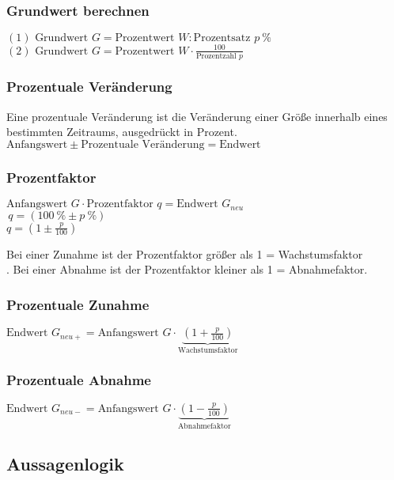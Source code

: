 \begin{multicols}{2}
    \subsubsection{Grundwert berechnen }
    \vspace{-4mm}
    $(1) \text{ Grundwert } G = \text{Prozentwert } W:\text{Prozentsatz } p\ \%$\\
    $(2) \text{ Grundwert } G = \text{Prozentwert } W \cdot \frac{100}{\text{Prozentzahl } p}$
    \subsubsection{Prozentuale Veränderung}
    \vspace{-4mm}
    Eine prozentuale Veränderung ist die Veränderung einer Größe innerhalb eines bestimmten Zeitraums, ausgedrückt in Prozent.\\
    $\text{Anfangswert} \pm \text{Prozentuale Veränderung} = \text{Endwert}$
    \subsubsection{Prozentfaktor}
    \vspace{-4mm}
    $\text{Anfangswert } G \cdot \text{Prozentfaktor } q = \text{Endwert } G_{neu}$\\
    $\,q = \left(100\ \% \pm p\ \%\right)$\\
    $q = \left(1 \pm \frac{p}{100}\right)$

    Bei einer Zunahme ist der Prozentfaktor größer als 1 = Wachstumsfaktor\\.
    Bei einer Abnahme ist der Prozentfaktor kleiner als 1 = Abnahmefaktor.
    \subsubsection{Prozentuale Zunahme}
    \vspace{-4mm}
    $\text{Endwert } G_{neu+} = \text{Anfangswert } G \cdot \underbrace{\left(1 + \frac{p}{100}\right)}_{\text{Wachstumsfaktor}}$
    \subsubsection{Prozentuale Abnahme}
    \vspace{-4mm}
    $\text{Endwert } G_{neu-} = \text{Anfangswert } G \cdot \underbrace{\left(1 - \frac{p}{100}\right)}_{\text{Abnahmefaktor}}$


    \subsection{Aussagenlogik}
    \vspace{-4mm}

\end{multicols}
